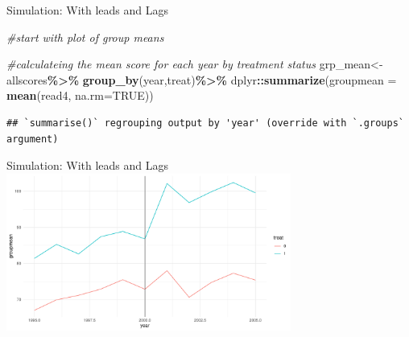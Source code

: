 \documentclass[
  ignorenonframetext,
]{beamer}
\newenvironment{Shaded}{\begin{snugshade}}{\end{snugshade}}
\newcommand{\CommentTok}[1]{\textcolor[rgb]{0.56,0.35,0.01}{\textit{#1}}}
\newcommand{\DataTypeTok}[1]{\textcolor[rgb]{0.13,0.29,0.53}{#1}}
\newcommand{\DecValTok}[1]{\textcolor[rgb]{0.00,0.00,0.81}{#1}}
\newcommand{\KeywordTok}[1]{\textcolor[rgb]{0.13,0.29,0.53}{\textbf{#1}}}
\newcommand{\NormalTok}[1]{#1}
\newcommand{\OperatorTok}[1]{\textcolor[rgb]{0.81,0.36,0.00}{\textbf{#1}}}
\newcommand{\OtherTok}[1]{\textcolor[rgb]{0.56,0.35,0.01}{#1}}
\newcommand{\StringTok}[1]{\textcolor[rgb]{0.31,0.60,0.02}{#1}}
\begin{document}
\begin{frame}[fragile]{Simulation: With leads and Lags}
\protect\hypertarget{simulation-with-leads-and-lags-4}{}
\tiny

\begin{Shaded}
\begin{Highlighting}[]
\CommentTok{\#start with plot of group means}

\CommentTok{\#calculateing the mean score for each year by treatment status}
\NormalTok{grp\_mean\textless{}{-}allscores}\OperatorTok{\%\textgreater{}\%}
\StringTok{    }\KeywordTok{group\_by}\NormalTok{(year,treat)}\OperatorTok{\%\textgreater{}\%}
\StringTok{    }\NormalTok{dplyr}\OperatorTok{::}\KeywordTok{summarize}\NormalTok{(}\DataTypeTok{groupmean =} \KeywordTok{mean}\NormalTok{(read4, }\DataTypeTok{na.rm=}\OtherTok{TRUE}\NormalTok{))}
\end{Highlighting}
\end{Shaded}

\begin{verbatim}
## `summarise()` regrouping output by 'year' (override with `.groups` argument)
\end{verbatim}

\begin{Shaded}
\end{Shaded}
\end{frame}

\begin{frame}{Simulation: With leads and Lags}
\protect\hypertarget{simulation-with-leads-and-lags-5}{}
\includegraphics[width=0.7\textwidth,height=\textheight]{"Slides_DID_files/figure-beamer/didplot-1.pdf"}
\end{frame}
\end{document}
